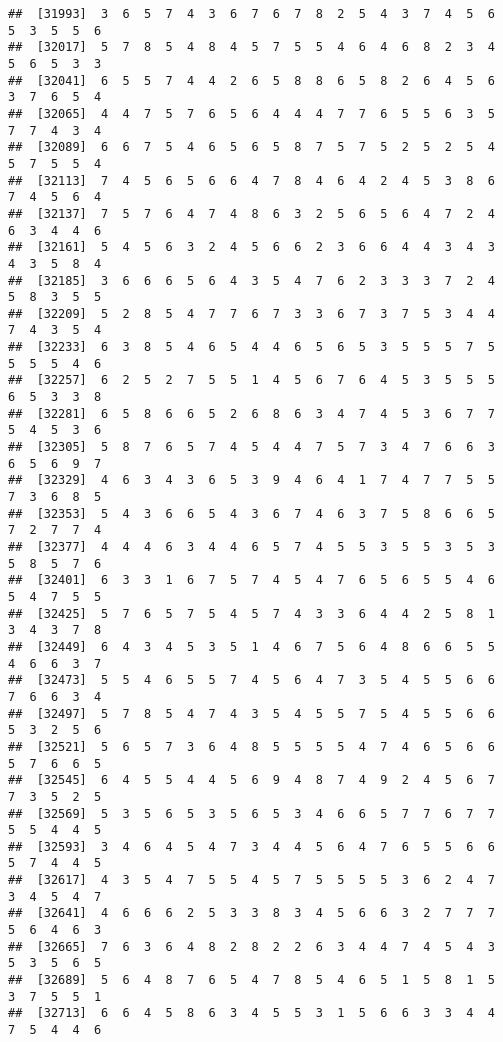 \documentclass[
]{book}
\begin{document}
\begin{verbatim}
##  [31993]  3  6  5  7  4  3  6  7  6  7  8  2  5  4  3  7  4  5  6  5  3  5  5  6
##  [32017]  5  7  8  5  4  8  4  5  7  5  5  4  6  4  6  8  2  3  4  5  6  5  3  3
##  [32041]  6  5  5  7  4  4  2  6  5  8  8  6  5  8  2  6  4  5  6  3  7  6  5  4
##  [32065]  4  4  7  5  7  6  5  6  4  4  4  7  7  6  5  5  6  3  5  7  7  4  3  4
##  [32089]  6  6  7  5  4  6  5  6  5  8  7  5  7  5  2  5  2  5  4  5  7  5  5  4
##  [32113]  7  4  5  6  5  6  6  4  7  8  4  6  4  2  4  5  3  8  6  7  4  5  6  4
##  [32137]  7  5  7  6  4  7  4  8  6  3  2  5  6  5  6  4  7  2  4  6  3  4  4  6
##  [32161]  5  4  5  6  3  2  4  5  6  6  2  3  6  6  4  4  3  4  3  4  3  5  8  4
##  [32185]  3  6  6  6  5  6  4  3  5  4  7  6  2  3  3  3  7  2  4  5  8  3  5  5
##  [32209]  5  2  8  5  4  7  7  6  7  3  3  6  7  3  7  5  3  4  4  7  4  3  5  4
##  [32233]  6  3  8  5  4  6  5  4  4  6  5  6  5  3  5  5  5  7  5  5  5  5  4  6
##  [32257]  6  2  5  2  7  5  5  1  4  5  6  7  6  4  5  3  5  5  5  6  5  3  3  8
##  [32281]  6  5  8  6  6  5  2  6  8  6  3  4  7  4  5  3  6  7  7  5  4  5  3  6
##  [32305]  5  8  7  6  5  7  4  5  4  4  7  5  7  3  4  7  6  6  3  6  5  6  9  7
##  [32329]  4  6  3  4  3  6  5  3  9  4  6  4  1  7  4  7  7  5  5  7  3  6  8  5
##  [32353]  5  4  3  6  6  5  4  3  6  7  4  6  3  7  5  8  6  6  5  7  2  7  7  4
##  [32377]  4  4  4  6  3  4  4  6  5  7  4  5  5  3  5  5  3  5  3  5  8  5  7  6
##  [32401]  6  3  3  1  6  7  5  7  4  5  4  7  6  5  6  5  5  4  6  5  4  7  5  5
##  [32425]  5  7  6  5  7  5  4  5  7  4  3  3  6  4  4  2  5  8  1  3  4  3  7  8
##  [32449]  6  4  3  4  5  3  5  1  4  6  7  5  6  4  8  6  6  5  5  4  6  6  3  7
##  [32473]  5  5  4  6  5  5  7  4  5  6  4  7  3  5  4  5  5  6  6  7  6  6  3  4
##  [32497]  5  7  8  5  4  7  4  3  5  4  5  5  7  5  4  5  5  6  6  5  3  2  5  6
##  [32521]  5  6  5  7  3  6  4  8  5  5  5  5  4  7  4  6  5  6  6  5  7  6  6  5
##  [32545]  6  4  5  5  4  4  5  6  9  4  8  7  4  9  2  4  5  6  7  7  3  5  2  5
##  [32569]  5  3  5  6  5  3  5  6  5  3  4  6  6  5  7  7  6  7  7  5  5  4  4  5
##  [32593]  3  4  6  4  5  4  7  3  4  4  5  6  4  7  6  5  5  6  6  5  7  4  4  5
##  [32617]  4  3  5  4  7  5  5  4  5  7  5  5  5  5  3  6  2  4  7  3  4  5  4  7
##  [32641]  4  6  6  6  2  5  3  3  8  3  4  5  6  6  3  2  7  7  7  5  6  4  6  3
##  [32665]  7  6  3  6  4  8  2  8  2  2  6  3  4  4  7  4  5  4  3  5  3  5  6  5
##  [32689]  5  6  4  8  7  6  5  4  7  8  5  4  6  5  1  5  8  1  5  3  7  5  5  1
##  [32713]  6  6  4  5  8  6  3  4  5  5  3  1  5  6  6  3  3  4  4  7  5  4  4  6

\end{verbatim}
\end{document}
